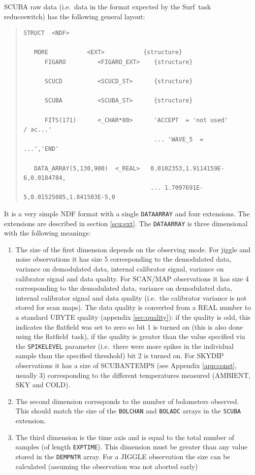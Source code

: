 \documentclass[twoside,11pt]{article}
\newenvironment{myquote}{\begin{quote}\begin{small}}{\end{small}\end{quote}}
\newcommand{\task}[1]{{\sf #1}}
\newcommand{\param}[1]{{\tt #1}}
\newcommand{\resw}{\xref{\task{reduce\_switch}}{sun216}{REDUCE_SWITCH}}
\newcommand{\flatf}{\xref{\task{flatfield}}{sun216}{FLATFIELD}}
\newcommand{\scusoft}          {{\sc Surf}}
\newcommand{\xref}[3]{#1}
\renewcommand{\_}{\texttt{\symbol{95}}}
\begin{document}
SCUBA raw data (i.e.\ data in the format expected by the \scusoft\ task
\resw) has the following general layout:

\begin{myquote}
\begin{verbatim}
STRUCT  <NDF>

   MORE           <EXT>           {structure}
      FIGARO         <FIGARO_EXT>    {structure}

      SCUCD          <SCUCD_ST>      {structure}

      SCUBA          <SCUBA_ST>      {structure}

      FITS(171)      <_CHAR*80>      'ACCEPT  = 'not used'           / ac...'
                                     ... 'WAVE_5  =                 ...','END'

   DATA_ARRAY(5,130,900)  <_REAL>   0.0102353,1.9114159E-6,0.0184784,
                                    ... 1.7097691E-5,0.01525085,1.841503E-5,0
\end{verbatim}
\end{myquote}
It is a very simple NDF format with a single \texttt{DATA\_ARRAY} and
four extensions. The extensions are described in section \ref{scu:ext}.
The \texttt{DATA\_ARRAY} is three dimensional with the following meanings:

\begin{enumerate}
\item The size of the first dimension depends on the observing mode. For
jiggle and noise observations it has size 5 corresponding to the demodulated
data, variance on demodulated data, internal calibrator signal, variance on
calibrator signal and data quality. For SCAN/MAP observations it has size 4
corresponding to the demodulated data, variance on demodulated data, internal
calibrator signal and data quality (i.e.\ the calibrator variance is not
stored for scan maps). The data quality is converted from a REAL number to a
standard UBYTE quality (appendix \ref{sec:quality}): if the quality is odd,
this indicates the flatfield was set to zero so bit 1 is turned on (this is
also done using the \flatf\ task), if the quality is greater than the value
specified via the \param{SPIKE\_LEVEL} parameter (i.e.\ there were more spikes
in the individual sample than the specified threshold) bit 2 is turned on. For
SKYDIP observations it has a size of SCUBA\_\_N\_TEMPS (see Appendix
\ref{app:const}, usually 3) corresponding to the different temperatures
measured (AMBIENT, SKY and COLD).

\item The second dimension corresponds to the number of bolometers
observed. This should match the size of the \texttt{BOL\_CHAN} and
\texttt{BOL\_ADC} arrays in the \texttt{SCUBA} extension.

\item The third dimension is the time axis and is equal to the total number of
samples (of length \texttt{EXP\_TIME}). This dimension must be greater than
any value stored in the \texttt{DEM\_PNTR} array. For a JIGGLE observation
the size can be calculated (assuming the observation was not aborted early)

\end{enumerate}
\end{document}
